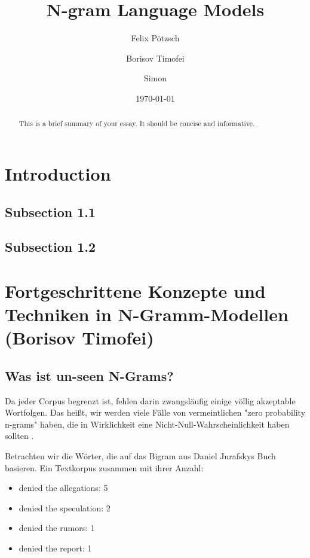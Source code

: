 \documentclass[12pt]{article}
\title{N-gram Language Models}
\author{
  Felix Pötzsch\\
  \and
  Borisov Timofei \\
  \and
  Simon \\
}
\date{\today}
\begin{document}
\maketitle

\begin{abstract}
	This is a brief summary of your essay. It should be concise and informative.
\end{abstract}

\tableofcontents
\clearpage

\section{Introduction}

\subsection{Subsection 1.1}


\subsection{Subsection 1.2}


\clearpage
\section{Fortgeschrittene Konzepte und Techniken in N-Gramm-Modellen (Borisov Timofei)}
\subsection{Was ist un-seen N-Grams?}
Da jeder Corpus begrenzt ist, fehlen darin zwangsläufig einige völlig akzeptable Wortfolgen. Das heißt, wir werden viele Fälle von vermeintlichen "zero probability n-grams" haben, die in Wirklichkeit eine Nicht-Null-Wahrscheinlichkeit haben sollten \cite{jurafsky2023}.

Betrachten wir die Wörter, die auf das Bigram aus Daniel Jurafskys Buch basieren. Ein Textkorpus zusammen mit ihrer Anzahl:

\begin{itemize}
	\item denied the allegations: 5
	\item denied the speculation: 2
	\item denied the rumors: 1
	\item denied the report: 1
\end{itemize}
\end{document}
